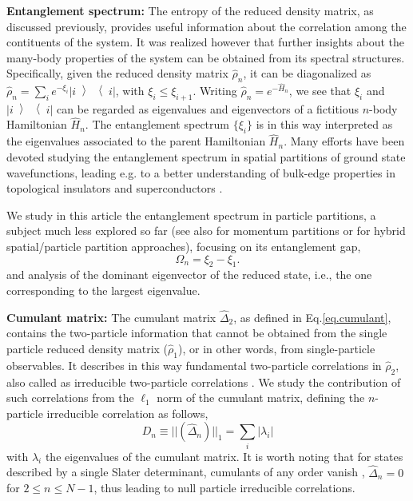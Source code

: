 \documentclass[prb,reprint,showpacs,twocolumn,superscriptaddress]{revtex4-2}
\newcommand{\ketbra}[2]{\left|#1\middle\rangle\middle\langle#2\right|}
\begin{document}
\textbf{Entanglement spectrum:} The entropy of the reduced density matrix, as discussed previously, 
provides useful information about the correlation among the contituents of the system. 
It was realized however that further insights about the many-body properties of the system can be 
obtained from its spectral structures.
Specifically, given the reduced density matrix $\hat \rho_n$, 
it can be diagonalized as 
$\hat \rho_n = \sum_i e^{-\xi_i} \ketbra{i}{i}$, with $\xi_i \leq \xi_{i+1}$. 
Writing $\hat \rho_n = e^{-\hat H_n}$, 
we see that $\xi_i$ and $\ketbra{i}{i}$ can be regarded as eigenvalues and eigenvectors 
of a fictitious $n$-body Hamiltonian $\hat H_n$. 
The entanglement spectrum $\{\xi_i\}$ is in this way interpreted as the eigenvalues 
associated to the parent Hamiltonian $\hat H_n$. 
Many efforts have been devoted studying the entanglement spectrum in spatial partitions of ground state wavefunctions, 
leading e.g. to a better understanding of bulk-edge properties in topological insulators and superconductors 
\cite{Li2008,Fidkowski2010,Turner2011}.

We study in this article the entanglement spectrum in particle partitions, 
a subject much less explored so far \cite{Zhao2010,Herdman2015,Masudul2009} 
(see also \cite{Rex2014} for momentum partitions or 
\cite{Alexandradinata2011,Sterdyniak2011} for hybrid spatial/particle partition approaches),
focusing on its entanglement gap,
\begin{equation}\label{eq:ent.gap}
 \Omega_n = \xi_2 - \xi_1.
\end{equation} 
and analysis of the dominant eigenvector of the reduced state, i.e., the one corresponding to the largest eigenvalue.

\textbf{Cumulant matrix:} The cumulant matrix $\hat \Delta_2$, as defined in Eq.\eqref{eq.cumulant}, 
contains the two-particle information that cannot be obtained 
from the single particle reduced density matrix ($\hat \rho_1$), 
or in other words, from single-particle observables. 
It describes in this way fundamental two-particle correlations in $\hat \rho_2$, 
also called as irreducible two-particle correlations \cite{Werner1999}.
We study the contribution of such correlations from the $\ell_1$ norm of the cumulant matrix, 
defining the $n$-particle irreducible correlation as follows,
\begin{equation}
 D_{n} \equiv ||(\hat \Delta_n)||_{1} 
 = \sum_i |\lambda_i|
\end{equation}
with $\lambda_i$ the eigenvalues of the cumulant matrix.
It is worth noting that for states described by a single Slater determinant, 
cumulants of any order vanish \cite{Werner1999}, $\hat \Delta_{n} = 0$ for $2\leq n \leq N-1$, 
thus leading to null particle irreducible correlations.
\end{document}
